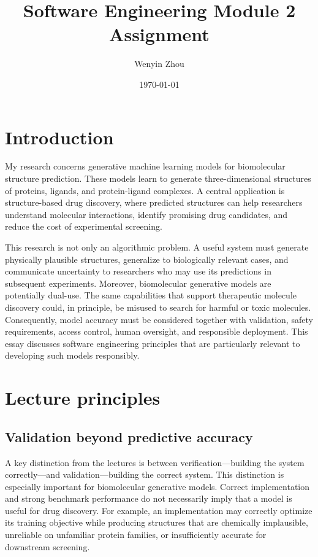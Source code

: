 \documentclass[a4paper,11pt]{article}
\title{Software Engineering Module 2 Assignment}
\author{Wenyin Zhou}
\date{\today}
\begin{document}
\maketitle

\section{Introduction}

My research concerns generative machine learning models for biomolecular structure prediction. These models learn to generate three-dimensional structures of proteins, ligands, and protein-ligand complexes. A central application is structure-based drug discovery, where predicted structures can help researchers understand molecular interactions, identify promising drug candidates, and reduce the cost of experimental screening.

This research is not only an algorithmic problem. A useful system must generate physically plausible structures, generalize to biologically relevant cases, and communicate uncertainty to researchers who may use its predictions in subsequent experiments. Moreover, biomolecular generative models are potentially dual-use. The same capabilities that support therapeutic molecule discovery could, in principle, be misused to search for harmful or toxic molecules. Consequently, model accuracy must be considered together with validation, safety requirements, access control, human oversight, and responsible deployment. This essay discusses software engineering principles that are particularly relevant to developing such models responsibly.


\section{Lecture principles}

\subsection{Validation beyond predictive accuracy}

A key distinction from the lectures is between verification---building the system correctly---and validation---building the correct system. This distinction is especially important for biomolecular generative models. Correct implementation and strong benchmark performance do not necessarily imply that a model is useful for drug discovery. For example, an implementation may correctly optimize its training objective while producing structures that are chemically implausible, unreliable on unfamiliar protein families, or insufficiently accurate for downstream screening.
\end{document}
